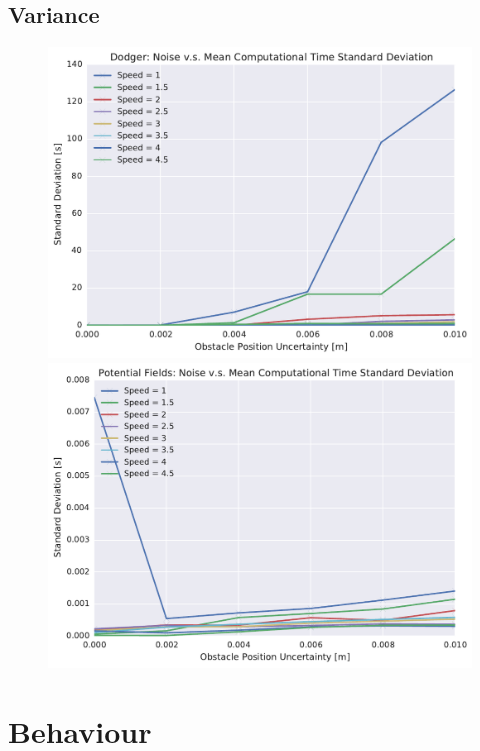 \subsection{Variance}

\begin{figure}[h!]
    \centering
    \includegraphics[width=0.48\linewidth]{figs/planner_std_avg_times_0}
    \includegraphics[width=0.48\linewidth]{figs/pf_std_avg_times_0}
    \caption{}
    \label{fig:plot_std_comp_time}
\end{figure}

\section{Behaviour}


